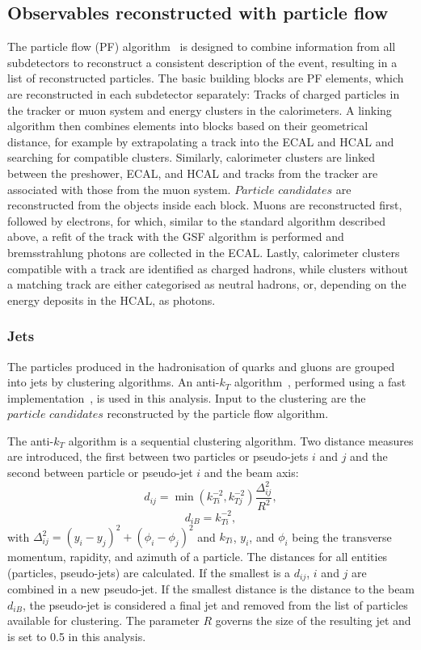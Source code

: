 \subsection{Observables reconstructed with particle flow}
\label{sec:PF}
The particle flow (PF) algorithm~\cite{CMS-PAS-PFT-09-001} is designed to combine information from all subdetectors to reconstruct a consistent description of the event, resulting in a list of reconstructed particles. The basic building blocks are PF elements, which are reconstructed in each subdetector separately: Tracks of charged particles in the tracker or muon system and energy clusters in the calorimeters. A linking algorithm then combines elements into blocks based on their geometrical distance, for example by extrapolating a track into the ECAL and HCAL and searching for compatible clusters. Similarly, calorimeter clusters are linked between the preshower, ECAL, and HCAL and tracks from the tracker are associated with those from the muon system. $\textit{Particle candidates}$ are reconstructed from the objects inside each block. Muons are reconstructed first, followed by electrons, for which, similar to the standard algorithm described above, a refit of the track with the GSF algorithm is performed and bremsstrahlung photons are collected in the ECAL. Lastly, calorimeter clusters compatible with a track are identified as charged hadrons, while clusters without a matching track are either categorised as neutral hadrons, or, depending on the energy deposits in the HCAL, as photons. 
\subsubsection{Jets}
The particles produced in the hadronisation of quarks and gluons are grouped into jets by clustering algorithms. An anti-$k_T$ algorithm~\cite{Cacciari:2008gp}, performed using a fast implementation~\cite{Cacciari:2011ma,Cacciari:2005hq}, is used in this analysis.  Input to the clustering are the $\textit{particle candidates}$ reconstructed by the particle flow algorithm.

The anti-$k_T$ algorithm is a sequential clustering algorithm. Two distance measures are introduced, the first between two particles or pseudo-jets $i$ and $j$ and the second between particle or pseudo-jet $i$ and the beam axis: 
\begin{equation}
d_{ij} = \min(k_{Ti}^{-2},k_{Tj}^{-2})\frac{\Delta^2_{ij}}{R^2},
\end{equation}
\begin{equation}
d_{iB} = k_{Ti}^{-2},
\end{equation}
with $\Delta_{ij}^2 = (y_i-y_j)^2 + (\phi_i - \phi_j)^2$ and $k_{Ti}$, $y_i$, and $\phi_i$ being the transverse momentum, rapidity, and azimuth of a particle. The distances for all entities (particles, pseudo-jets) are calculated. If the smallest is a $d_{ij}$, $i$ and $j$ are combined in a new pseudo-jet. If the smallest distance is the distance to the beam $d_{iB}$, the pseudo-jet is considered a final jet and removed from the list of particles available for clustering. The parameter $R$ governs the size of the resulting jet and is set to 0.5 in this analysis. 

